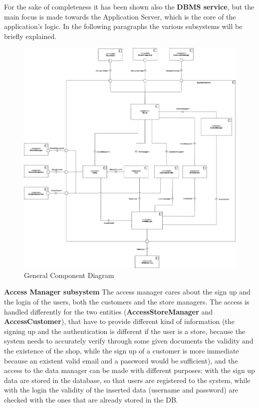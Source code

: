 \documentclass[]{article}
\begin{document}
	\textbf{} \newline
For the sake of completeness it has been shown also the \textbf{DBMS service}, but the main focus is made towards the Application Server, which is the core of the application’s logic. \newline\newline
In the following paragraphs the various subsystems will be briefly explained.\\

	\begin{figure}[H]
			\centering
			\includegraphics[scale=0.3]{ComponentView/ComponentViewDiagram.png}
			\caption{General Component Diagram}
			\label{fig:ComponentDiagram}
		\end{figure}
		\bigskip\bigskip
	\newpage
	\noindent
	\textbf{Access Manager subsystem} \newline
	The access manager cares about the sign up and the login of the users, both the customers and the store managers. The access is handled differently for the two entities (\textbf{AccessStoreManager} and \textbf{AccessCustomer}), that have to provide different kind of information (the signing up and the authentication is different if the user is a store, because the system needs to accurately verify through some given documents the validity and the existence of the shop, while the sign up of a customer is more immediate because an existent valid email and a password would be sufficient), and the access to the data manager can be made with different purposes: with the sign up data are stored in the database, so that users are registered to the system, while with the login the validity of the inserted data (username and password) are checked with the ones that are already stored in the DB. 
\end{document}
